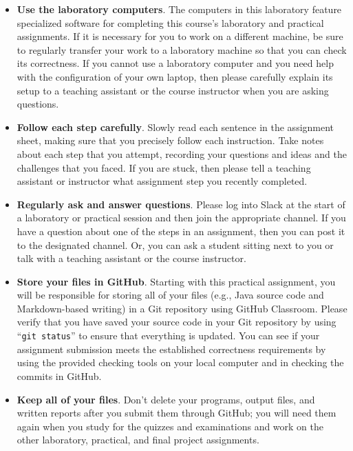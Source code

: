\documentclass[11pt]{article}
\newcommand{\command}[1]{``\lstinline{#1}''}
\begin{document}
\begin{itemize}
  \setlength{\itemsep}{0pt}

\item {\bf Use the laboratory computers}. The computers in this laboratory
  feature specialized software for completing this course's laboratory and
  practical assignments. If it is necessary for you to work on a different
  machine, be sure to regularly transfer your work to a laboratory machine so
  that you can check its correctness. If you cannot use a laboratory computer
  and you need help with the configuration of your own laptop, then please
  carefully explain its setup to a teaching assistant or the course instructor
  when you are asking questions.

\item {\bf Follow each step carefully}. Slowly read each sentence in the
  assignment sheet, making sure that you precisely follow each instruction. Take
  notes about each step that you attempt, recording your questions and ideas and
  the challenges that you faced. If you are stuck, then please tell a teaching
  assistant or instructor what assignment step you recently completed.

\item {\bf Regularly ask and answer questions}. Please log into Slack at the
  start of a laboratory or practical session and then join the appropriate
  channel. If you have a question about one of the steps in an assignment, then
  you can post it to the designated channel. Or, you can ask a student sitting
  next to you or talk with a teaching assistant or the course instructor.

\item {\bf Store your files in GitHub}. Starting with this practical assignment,
  you will be responsible for storing all of your files (e.g., Java source code
  and Markdown-based writing) in a Git repository using GitHub Classroom. Please
  verify that you have saved your source code in your Git repository by using
  \command{git status} to ensure that everything is updated. You can see if your
  assignment submission meets the established correctness requirements by using
  the provided checking tools on your local computer and in checking the commits
  in GitHub.

\item {\bf Keep all of your files}. Don't delete your programs, output files,
  and written reports after you submit them through GitHub; you will need them
  again when you study for the quizzes and examinations and work on the other
  laboratory, practical, and final project assignments.


\end{itemize}
\end{document}
